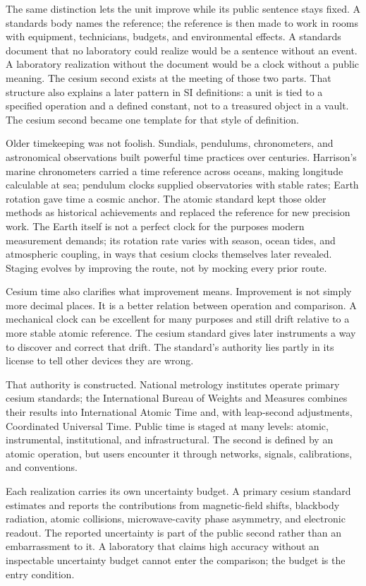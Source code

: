 The same distinction lets the unit improve while its public sentence stays
fixed. A standards body names the reference; the reference is then made to
work in rooms with equipment, technicians, budgets, and environmental
effects. A standards document that no laboratory could realize would be a
sentence without an event. A laboratory realization without the document
would be a clock without a public meaning. The cesium second exists at the
meeting of those two parts. That structure also explains a later pattern in SI definitions: a unit is
tied to a specified operation and a defined constant, not to a treasured
object in a vault. The cesium second became one template for that style of
definition.

Older timekeeping was not foolish. Sundials, pendulums, chronometers, and
astronomical observations built powerful time practices over centuries.
Harrison's marine chronometers carried a time reference across oceans, making
longitude calculable at sea; pendulum clocks supplied observatories with
stable rates; Earth rotation gave time a cosmic anchor. The atomic standard kept those older
methods as historical achievements and replaced the reference for new
precision work. The Earth itself is not a perfect clock for the purposes
modern measurement demands; its rotation rate varies with season, ocean
tides, and atmospheric coupling, in ways that cesium clocks themselves
later revealed. Staging evolves by improving the route, not by mocking
every prior route.

Cesium time also clarifies what improvement means. Improvement is not
simply more decimal places. It is a better relation between operation and
comparison. A mechanical clock can be excellent for many purposes and
still drift relative to a more stable atomic reference. The cesium
standard gives later instruments a way to discover and correct that drift.
The standard's authority lies partly in its license to tell other devices
they are wrong.

That authority is constructed. National metrology institutes operate
primary cesium standards; the International Bureau of Weights and Measures
combines their results into International Atomic Time and, with
leap-second adjustments, Coordinated Universal Time. Public time is staged
at many levels: atomic, instrumental, institutional, and infrastructural.
The second is defined by an atomic operation, but users encounter it
through networks, signals, calibrations, and conventions.

Each realization carries its own uncertainty budget. A primary cesium
standard estimates and reports the contributions from magnetic-field
shifts, blackbody radiation, atomic collisions, microwave-cavity phase
asymmetry, and electronic readout. The reported uncertainty is part of
the public second rather than an embarrassment to it. A laboratory that
claims high accuracy without an inspectable uncertainty budget cannot
enter the comparison; the budget is the entry condition.


